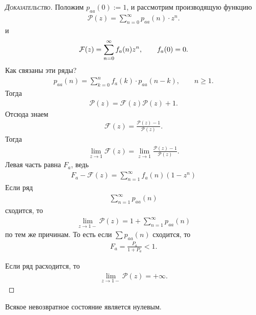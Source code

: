 \documentclass[../main.tex]{subfiles}
\begin{document}
\begin{proof}[\normalfont\textsc{Доказательство}]
 Положим $ p_{aa}(0) := 1 $, и рассмотрим производящую функцию
  \begin{align*}
   \mathcal P(z) = \sum_{n=0}^{\infty} p_{aa}(n) \cdot z^{n}.
 \end{align*} и
 \begin{align*}
  \mathcal F (z) = \sum_{n=0}^{\infty}f_a(n)z^{n}, \qquad f_a(0)=0.
 \end{align*}
 Как связаны эти ряды?
 \begin{align*}
  p_{aa}(n) = \sum_{k=0}^{n} f_a(k) \cdot p_{aa}(n-k), \qquad n \geqslant 1.
 \end{align*} Тогда
 \begin{align*}
  \mathcal P(z) = \mathcal F(z) \mathcal P(z) + 1.
 \end{align*} Отсюда знаем
 \begin{align*}
  \mathcal F(z) = \frac{\mathcal P(z)-1}{\mathcal P(z)}.
 \end{align*} Тогда
 \begin{align*}
  \lim_{z \to 1}  \mathcal F(z) = \lim_{z \to 1} \frac{\mathcal P(z) -1}{\mathcal P(z)}.
 \end{align*} Левая часть равна $ F_a $, ведь
 \begin{align*}
  F_a - \mathcal F(z) = \sum_{n=1}^{\infty} f_a(n) (1-z^{n})
 \end{align*} Если  ряд
 \begin{align*}
  \sum_{n=1}^{\infty}p_{aa}(n)
 \end{align*} сходится, то
 \begin{align*}
  \lim_{z \to 1-} \mathcal P(z) = 1 + \sum_{n=1}^{\infty} p_{aa}(n)
 \end{align*} по тем же причинам. То есть если $ \sum p_{aa}(n) $ сходится, то
 \begin{align*}
  F_a = \frac{P_a}{1+P_a} < 1.
 \end{align*}

 Если ряд расходится, то 
 \begin{align*}
  \lim_{z \to 1-} \mathcal P(z) = +\infty.
 \end{align*}
\end{proof}

\begin{crly}
 Всякое невозвратное состояние является нулевым.
\end{crly}
\end{document}
